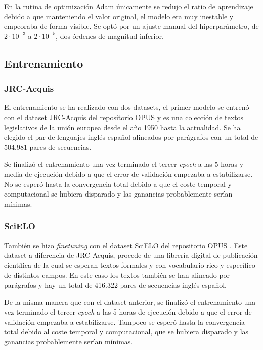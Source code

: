 En la rutina de optimización Adam \cite{Kingma2014Dec} únicamente se redujo el ratio de aprendizaje debido a que manteniendo el valor original, el modelo era muy inestable y empeoraba de forma visible. Se optó por un ajuste manual del hiperparámetro, de $2\cdot 10^{-3}$ a $2\cdot 10^{-5}$, dos órdenes de magnitud inferior.

\subsection{Entrenamiento}
\subsubsection{JRC-Acquis}
El entrenamiento se ha realizado con dos datasets, el primer modelo se entrenó con el dataset JRC-Acquis del repositorio OPUS \cite{CORPUS} y es una colección de textos legislativos de la unión europea desde el año 1950 hasta la actualidad. Se ha elegido el par de lenguajes inglés-español alineados por parágrafos con un total de 504.981 pares de secuencias.

Se finalizó el entrenamiento una vez terminado el tercer \textit{epoch} a las 5 horas y media de ejecución debido a que el error de validación empezaba a estabilizarse. No se esperó hasta la convergencia total debido a que el coste temporal y computacional se hubiera disparado y las ganancias probablemente serían mínimas.

\subsubsection{SciELO}
También se hizo \textit{finetuning} con el dataset SciELO del repositorio OPUS \cite{CORPUS}. Este dataset a diferencia de JRC-Acquis, procede de una librería digital de publicación científica de la cual se esperan textos formales y con vocabulario rico y específico de distintos campos. En este caso los textos también se han alineado por parágrafos y hay un total de 416.322 pares de secuencias inglés-español.

De la misma manera que con el dataset anterior, se finalizó el entrenamiento una vez terminado el tercer \textit{epoch} a las 5 horas de ejecución debido a que el error de validación empezaba a estabilizarse. Tampoco se esperó hasta la convergencia total debido al coste temporal y computacional, que se hubiera disparado y las ganancias probablemente serían mínimas.


